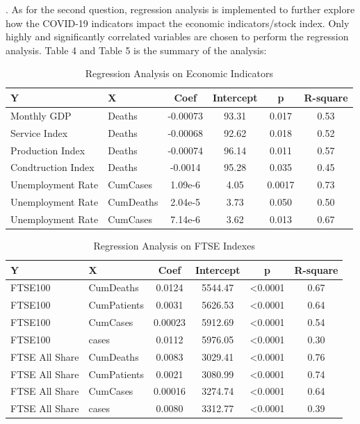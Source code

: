 \documentclass[12pt, a4paper]{report}
\begin{document}
. As for the second question, regression analysis is implemented to further explore how the COVID-19 indicators impact 
the economic indicators/stock index. Only highly and significantly correlated variables are chosen to perform the regression analysis.
Table 4 and Table 5 is the summary of the analysis:\par
\noindent

\begin{table}[H]
    \begin{center}
    \caption{Regression Analysis on Economic Indicators}
    \begin{tabular}{llcccc}
        \toprule
        Y&X&Coef&Intercept&p&R-square\\
        \midrule
        Monthly GDP&Deaths&-0.00073&93.31&0.017&0.53\\
        Service Index&Deaths&-0.00068&92.62&0.018&0.52\\
        Production Index&Deaths&-0.00074&96.14&0.011&0.57\\
        Condtruction Index&Deaths&-0.0014&95.28&0.035&0.45\\
        Unemployment Rate&CumCases&1.09e-6&4.05&0.0017&0.73\\
        Unemployment Rate&CumDeaths&2.04e-5&3.73&0.050&0.50\\
        Unemployment Rate&CumCases&7.14e-6&3.62&0.013&0.67\\
        \bottomrule
    \end{tabular}
    \end{center}
\end{table}

\begin{table}[H]
    \begin{center}
    \caption{Regression Analysis on FTSE Indexes}
    \begin{tabular}{llcccc}
        \toprule
        Y&X&Coef&Intercept&p&R-square\\
        \midrule
        FTSE100&CumDeaths&0.0124&5544.47&<0.0001&0.67\\
        FTSE100&CumPatients&0.0031&5626.53&<0.0001&0.64\\
        FTSE100&CumCases&0.00023&5912.69&<0.0001&0.54\\
        FTSE100&cases&0.0112&5976.05&<0.0001&0.30\\
        FTSE All Share&CumDeaths&0.0083&3029.41&<0.0001&0.76\\
        FTSE All Share&CumPatients&0.0021&3080.99&<0.0001&0.74\\
        FTSE All Share&CumCases&0.00016&3274.74&<0.0001&0.64\\
        FTSE All Share&cases&0.0080&3312.77&<0.0001&0.39\\
        \bottomrule
    \end{tabular}
    \end{center}
\end{table}
\end{document}
